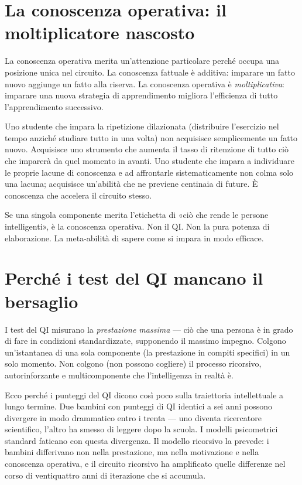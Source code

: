 \documentclass[11pt, twoside, openright]{book}
\begin{document}
\section*{La conoscenza operativa: il moltiplicatore nascosto}

La conoscenza operativa merita un'attenzione particolare perché occupa una posizione unica nel circuito. La conoscenza fattuale è additiva: imparare un fatto nuovo aggiunge un fatto alla riserva. La conoscenza operativa è \textit{moltiplicativa}: imparare una nuova strategia di apprendimento migliora l'efficienza di tutto l'apprendimento successivo.

Uno studente che impara la ripetizione dilazionata (distribuire l'esercizio nel tempo anziché studiare tutto in una volta) non acquisisce semplicemente un fatto nuovo. Acquisisce uno strumento che aumenta il tasso di ritenzione di tutto ciò che imparerà da quel momento in avanti. Uno studente che impara a individuare le proprie lacune di conoscenza e ad affrontarle sistematicamente non colma solo una lacuna; acquisisce un'abilità che ne previene centinaia di future. È conoscenza che accelera il circuito stesso.

Se una singola componente merita l'etichetta di «ciò che rende le persone intelligenti», è la conoscenza operativa. Non il QI. Non la pura potenza di elaborazione. La meta-abilità di sapere come si impara in modo efficace.

\section*{Perché i test del QI mancano il bersaglio}

I test del QI misurano la \textit{prestazione massima} --- ciò che una persona è in grado di fare in condizioni standardizzate, supponendo il massimo impegno. Colgono un'istantanea di una sola componente (la prestazione in compiti specifici) in un solo momento. Non colgono (non possono cogliere) il processo ricorsivo, autorinforzante e multicomponente che l'intelligenza in realtà è.

Ecco perché i punteggi del QI dicono così poco sulla traiettoria intellettuale a lungo termine. Due bambini con punteggi di QI identici a sei anni possono divergere in modo drammatico entro i trenta --- uno diventa ricercatore scientifico, l'altro ha smesso di leggere dopo la scuola. I modelli psicometrici standard faticano con questa divergenza. Il modello ricorsivo la prevede: i bambini differivano non nella prestazione, ma nella motivazione e nella conoscenza operativa, e il circuito ricorsivo ha amplificato quelle differenze nel corso di ventiquattro anni di iterazione che si accumula.
\end{document}
